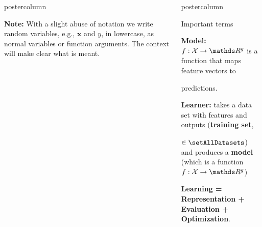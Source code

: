 \documentclass{beamer}
\newlength{\columnheight} %
\begin{document}
\begin{frame}[fragile]{}
\begin{columns}
\begin{column}{.31\textwidth}
\begin{beamercolorbox}[center]{postercolumn}
\begin{minipage}{.98\textwidth}
{\begin{myblock}{}
						\textbf{Note:} With a slight abuse of notation we write random variables, e.g., $\mathbf{x}$ and $y$, in lowercase, as normal variables or function arguments. The context will make clear what is meant.
						\end{myblock}
				}
			\end{minipage}
		\end{beamercolorbox}
	\end{column}
	\begin{column}{.31\textwidth}
		\begin{beamercolorbox}[center]{postercolumn}
			\begin{minipage}{.98\textwidth}
				\parbox[t][\columnheight]{\textwidth}{
				    \begin{myblock}{Important terms}
				        \begin{codebox}
						    \textbf{Model: }$f : \Xspace \rightarrow \R^g$ is a function that maps feature vectors to 
						\end{codebox}
						\begin{codebox}
						    predictions.
						\end{codebox}
            \vspace*{0.5ex}
						\begin{codebox}
						\textbf{Learner: } takes a data set with features and outputs (\textbf{training set},
						\end{codebox}
						\begin{codebox}
						$\in \setAllDatasets$)  and produces a \textbf{model} (which is a function $f : \Xspace \rightarrow \R^g$)
						\end{codebox}
						
            \vspace*{0.5ex}
						\begin{codebox}
						    \textbf{Learning = Representation + Evaluation  + Optimization}.
						\end{codebox}
						

\end{myblock}}
\end{minipage}
\end{beamercolorbox}
\end{column}
\end{columns}
\end{frame}
\end{document}
